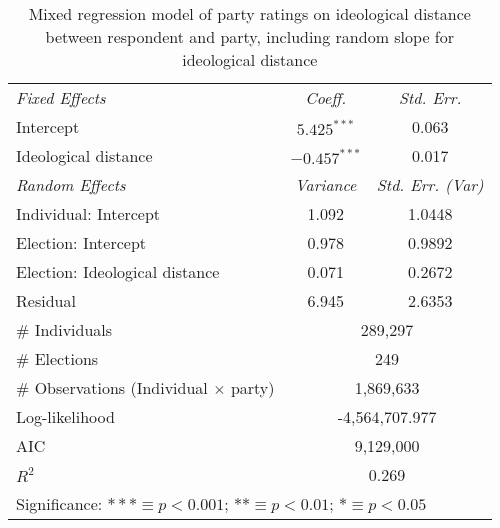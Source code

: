 \begin{table}[h]
	\centering
	\caption{Mixed regression model of party ratings on ideological distance between respondent and party, including random slope for ideological distance}
	\label{mreg}
	\begin{tabular}{lcc}
		\toprule
		\textit{Fixed Effects} & \textit{Coeff.} & \textit{Std. Err.}\\
		Intercept & $5.425^{***}$ & 0.063 \\
		Ideological distance & $-0.457^{***}$&  0.017 \\ \midrule
		\textit{Random Effects} & \textit{Variance }& \textit{Std. Err. (Var)}\\
		Individual: Intercept&     1.092 & 1.0448 \\
		Election: Intercept  & 0.978 & 0.9892 \\
		Election: Ideological distance & 0.071 & 0.2672 \\
		Residual & 6.945 & 2.6353 \\ \midrule
		\# Individuals & \multicolumn{2}{c}{289,297} \\
		\# Elections  & \multicolumn{2}{c}{249} \\
		\# Observations (Individual $\times$ party)  &  \multicolumn{2}{c}{1,869,633}    \\ \midrule
		Log-likelihood & \multicolumn{2}{c}{-4,564,707.977} \\
		AIC & \multicolumn{2}{c}{9,129,000} \\
		$R^2$& \multicolumn{2}{c}{0.269} \\
		\bottomrule
		\multicolumn{3}{p{.7\linewidth}}{Significance: 
			$*** \equiv p < 0{.}001$; 
			$** \equiv p < 0{.}01$; 
			$* \equiv p < 0{.}05$}\\
	\end{tabular}
\end{table}